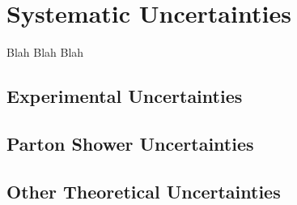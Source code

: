 \section{Systematic Uncertainties}
\label{sec:syst}

Blah Blah Blah

\subsection{Experimental Uncertainties}
\label{ssec:expUnc}

\subsection{Parton Shower Uncertainties}
\label{ssec:psUnc}

\subsection{Other Theoretical Uncertainties}
\label{ssec:theoUnc}

